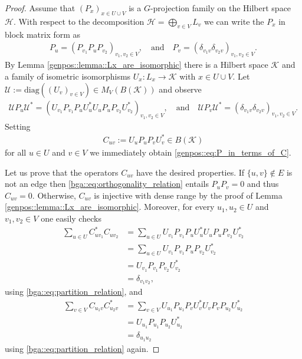 \documentclass[a4paper]{amsart}
\begin{document}
\begin{proof}
    Assume that $(P_x)_{x \in U \cup V}$ is a $G$-projection family on the Hilbert space $\mathcal{H}$. With respect to the decomposition $\mathcal{H} = \bigoplus_{v \in V} L_v$ we can write the $P_x$ in block matrix form as 
    \begin{align*}
        P_u = (P_{v_1} P_u P_{v_2})_{v_1, v_2 \in V}, 
        \quad \text{and} \quad
        P_v = (\delta_{v_1 v} \delta_{v_2 v})_{v_1, v_2 \in V}.
    \end{align*}
    By Lemma \ref{genpos::lemma::Lx_are_isomorphic} there is a Hilbert space $\mathcal{K}$ and a family of isometric isomorphisms $U_x: L_x \to \mathcal{K}$ with $x \in U \cup V$. Let $\mathcal{U} := \mathrm{diag}((U_v)_{v \in V}) \in M_V(B(\mathcal{K}))$ and observe
    \begin{align*}
        \mathcal{U} P_u \mathcal{U}^\ast = (U_{v_1} P_{v_1} P_u U_u^\ast U_u P_u P_{v_2} U_{v_2}^\ast)_{v_1, v_2 \in V}, 
        \quad \text{and} \quad
        \mathcal{U} P_v \mathcal{U}^\ast = (\delta_{v_1 v} \delta_{v_2 v})_{v_1, v_2 \in V}.
    \end{align*}
    Setting
    \begin{align*}
        C_{uv} := U_u P_u P_v U_v^\ast \in B(\mathcal{K})
    \end{align*}
    for all $u \in U$ and $v \in V$ we immediately obtain \eqref{genpos::eq:P_in_terms_of_C}.

    Let us prove that the operators $C_{uv}$ have the desired properties. If $\{u,v\} \not \in E$ is not an edge then \eqref{bga::eq:orthogonality_relation} entails $P_u P_v = 0$ and thus $C_{uv} = 0$. Otherwise, $C_{uv}$ is injective with dense range by the proof of Lemma \ref{genpos::lemma::Lx_are_isomorphic}. Moreover, for every $u_1, u_2 \in U$ and $v_1, v_2 \in V$ one easily checks
    \begin{align*}
        \sum_{u \in U} C_{u v_1}^\ast C_{u v_2}
            &= \sum_{u \in U} U_{v_1} P_{v_1} P_u U_u^\ast U_{u} P_u P_{v_2} U_{v_2}^\ast \\
            &= \sum_{u \in U} U_{v_1} P_{v_1} P_u P_{v_2} U_{v_2}^\ast \\
            &= U_{v_1} P_{v_1} P_{v_2} U_{v_2}^\ast \\
            &= \delta_{v_1 v_2},
    \end{align*}
    using \eqref{bga::eq:partition_relation}, and 
    \begin{align*}
        \sum_{v \in V} C_{u_1 v} C_{u_2 v}^\ast 
            &= \sum_{v \in V} U_{u_1} P_{u_1} P_{v} U_{v}^\ast U_{v} P_v P_{u_2} U_{u_2}^\ast \\
            &= U_{u_1} P_{u_1} P_{u_2} U_{u_2}^\ast \\
            &= \delta_{u_1 u_2}
    \end{align*}
    using \eqref{bga::eq:partition_relation} again.


\end{proof}
\end{document}
